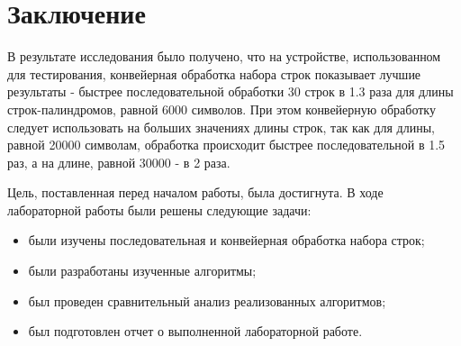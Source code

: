 \chapter*{Заключение}

В результате исследования было получено, что на устройстве, использованном для тестирования, конвейерная обработка набора строк показывает лучшие результаты - быстрее последовательной обработки 30 строк в 1.3 раза для длины строк-палиндромов, равной 6000 символов. При этом конвейерную обработку следует использовать на больших значениях длины строк, так как для длины, равной 20000 символам, обработка происходит быстрее последовательной в 1.5 раз, а на длине, равной 30000 - в 2 раза.

Цель, поставленная перед началом работы, была достигнута. В ходе лабораторной работы были решены следующие задачи:

\begin{itemize}
	\item были изучены последовательная и конвейерная обработка набора строк;
	\item были разработаны изученные алгоритмы;
	\item был проведен сравнительный анализ реализованных алгоритмов;
	\item был подготовлен отчет о выполненной лабораторной работе.
\end{itemize}
